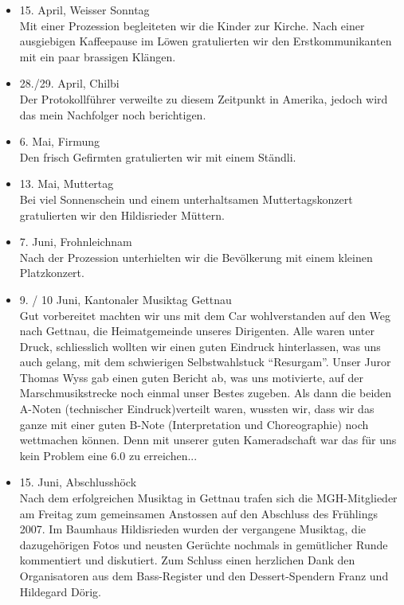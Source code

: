 \begin{history}
\begin{itemize}
        \item[]15. April, Weisser Sonntag\\
        Mit einer Prozession begleiteten wir die Kinder zur Kirche. Nach einer
        ausgiebigen Kaffeepause im Löwen gratulierten wir den Erstkommunikanten
        mit ein paar brassigen Klängen.

        \item[]28./29. April, Chilbi\\
        Der Protokollführer verweilte zu diesem Zeitpunkt in Amerika, jedoch
        wird das mein Nachfolger noch berichtigen.

        \item[]6. Mai, Firmung\\
        Den frisch Gefirmten gratulierten wir mit einem Ständli.

        \item[]13. Mai, Muttertag\\
        Bei viel Sonnenschein und einem unterhaltsamen Muttertagskonzert
        gratulierten wir den Hildisrieder Müttern.

        \item[]7. Juni, Frohnleichnam\\
        Nach der Prozession unterhielten wir die Bevölkerung mit einem kleinen
        Platzkonzert.

        \item[]9. / 10 Juni, Kantonaler Musiktag Gettnau\\
        Gut vorbereitet machten wir uns mit dem Car wohlverstanden auf den Weg
        nach Gettnau, die Heimatgemeinde unseres Dirigenten. Alle waren unter
        Druck, schliesslich wollten wir einen guten Eindruck hinterlassen, was
        uns auch gelang, mit dem schwierigen Selbstwahlstuck \enquote{Resurgam}.
        Unser Juror Thomas Wyss gab einen guten Bericht ab, was uns motivierte,
        auf der Marschmusikstrecke noch einmal unser Bestes zugeben. Als dann
        die beiden A-Noten (technischer Eindruck)verteilt waren, wussten wir,
        dass wir das ganze mit einer guten B-Note (Interpretation und
        Choreographie) noch wettmachen können. Denn mit unserer guten
        Kameradschaft war das für uns kein Problem eine 6.0 zu erreichen...

        \item[]15. Juni, Abschlusshöck\\
        Nach dem erfolgreichen Musiktag in Gettnau trafen sich die
        MGH-Mitglieder am Freitag zum gemeinsamen Anstossen auf den Abschluss
        des Frühlings 2007. Im Baumhaus Hildisrieden wurden der vergangene
        Musiktag, die dazugehörigen Fotos und neusten Gerüchte nochmals in
        gemütlicher Runde kommentiert und diskutiert. Zum Schluss einen
        herzlichen Dank den Organisatoren aus dem Bass-Register und den
        Dessert-Spendern Franz und Hildegard Dörig.


\end{itemize}
\end{history}
